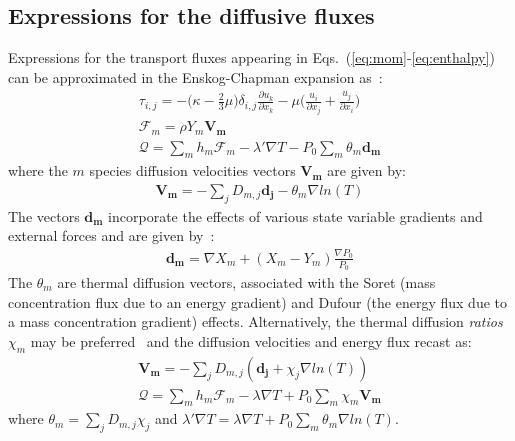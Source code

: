 \subsection{Expressions for the diffusive fluxes}
\label{sub:DifFluxes}
Expressions for the transport fluxes appearing in Eqs.~(\ref{eq:mom}-\ref{eq:enthalpy}) can be approximated in the Enskog-Chapman expansion as~\cite{Ern:1994multicomponent}:
 \begin{eqnarray}
\tau_{i,j} = - \Big(\kappa - \frac{2}{3} \mu \Big) \delta_{i,j} \frac{\partial {u_k}}{\partial x_k} - \mu \Big(\frac{u_i}{\partial x_j} + \frac{u_j}{\partial x_i}\Big)
\\
\boldsymbol{\mathcal{F}}_{m} = \rho Y_m \boldsymbol{V_m}
\\
\boldsymbol{\mathcal{Q}} =  \sum_m h_m \boldsymbol{\mathcal{F}}_{m}  - \lambda' \nabla T - P_0 \sum_m \theta_m \boldsymbol{d_m}
\end{eqnarray}
where the $m$ species diffusion velocities vectors $\boldsymbol{V_m}$ are given by:
 \begin{eqnarray}
\boldsymbol{V_m} = - \sum_j  {D}_{m,j} \boldsymbol{d_j} - \theta_m \nabla ln(T)
\end{eqnarray}
The vectors $\boldsymbol{d_m}$ incorporate the effects of various state variable gradients and external forces and are given by~\cite{Ern:1994multicomponent}:
 \begin{eqnarray}
\boldsymbol{d_m} = \nabla X_m + (X_m -Y_m) \frac{\nabla P_0}{P_0}
\label{dmeqs}
\end{eqnarray}
The $\theta_m$ are thermal diffusion vectors, associated with the Soret (mass concentration flux due to an energy gradient) and Dufour (the energy flux due to a mass concentration gradient) effects. Alternatively, the thermal diffusion \emph{ratios} $\chi_m$ may be preferred~\cite{Ern:1994multicomponent} and the diffusion velocities and energy flux recast as:
 \begin{eqnarray}
\boldsymbol{V_m} = - \sum_j  {D}_{m,j} ( \boldsymbol{d_j} + \chi_j \nabla ln(T))
\\
\boldsymbol{\mathcal{Q}} =  \sum_m h_m \boldsymbol{\mathcal{F}}_{m}  - \lambda \nabla T + P_0 \sum_m \chi_m \boldsymbol{V_m}
\end{eqnarray}
where  $\theta_m = \sum_j  {D}_{m,j} \chi_j$ and $\lambda' \nabla T = \lambda \nabla T + P_0 \sum_m \theta_m \nabla ln(T)$.

